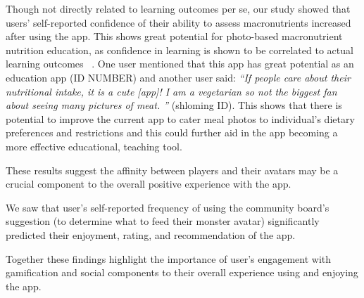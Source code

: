 Though not directly related to learning outcomes per se, our study showed that users' self-reported confidence of their ability to assess macronutrients increased after using the app. This shows great potential for photo-based macronutrient nutrition education, as confidence in learning is shown to be correlated to actual learning outcomes ~\cite{badura1995exercise,choi2005self,de2013relationship,nicholson2013key,wesson2011self}. One user mentioned that this app has great potential as an education app (ID NUMBER) and another user said: \textit{``If people care about their nutritional intake, it is a cute [app]! I am a vegetarian so not the biggest fan about seeing many pictures of meat. ''} (shloming ID).
This shows that there is potential to improve the current app to cater meal photos to individual's dietary preferences and restrictions and this could further aid in the app becoming a more effective educational, teaching tool. 


These results suggest the affinity between players and their avatars may be a crucial component to the overall positive experience with the app.

We saw that user's self-reported frequency of using the community board's suggestion (to determine what to feed their monster avatar)  significantly predicted their enjoyment, rating, and recommendation of the app. 

Together these findings highlight the importance of user's engagement with gamification and social components to their overall experience using and enjoying the app. 





